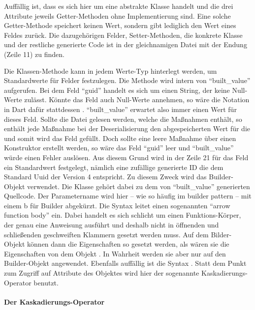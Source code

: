 Auffällig ist, dass es sich hier um eine abstrakte Klasse handelt und die drei Attribute jeweils Getter-Methoden ohne Implementierung sind.
Eine solche Getter-Methode speichert keinen Wert, sondern gibt lediglich den Wert eines Feldes zurück.
Die dazugehörigen Felder,  Setter-Methoden, die konkrete Klasse und der restliche generierte Code ist in der gleichnamigen Datei mit der Endung  (Zeile 11) zu finden.

Die Klassen-Methode  kann in jedem Werte-Typ hinterlegt werden, um Standardwerte für Felder festzulegen.
Die Methode wird intern von \enquote{built_value} aufgerufen.
Bei dem Feld \enquote{guid} handelt es sich um einen String, der keine Null-Werte zulässt.
Könnte das Feld auch Null-Werte annehmen, so wäre die Notation in Dart dafür stattdessen . \enquote{built_value} erwartet also immer einen Wert für dieses Feld. Sollte die Datei gelesen werden, welche die Maßnahmen enthält, so enthält jede Maßnahme bei der Deserialisierung den abgespeicherten Wert für die  und somit wird das Feld gefüllt. Doch sollte eine leere Maßnahme über einen Konstruktor erstellt werden, so wäre das Feld \enquote{guid} leer und \enquote{built_value} würde einen Fehler auslösen. Aus diesem Grund wird in der Zeile 21 für das Feld  ein Standardwert festgelegt, nämlich eine zufällige generierte ID die dem Standard Uuid der Version 4 entspricht.
Zu diesem Zweck wird das Builder-Objekt verwendet.
Die Klasse  gehört dabei zu dem von \enquote{built_value} generierten Quellcode.
Der Parametername wird hier – wie so häufig im builder pattern – mit einem b für Builder abgekürzt.
Die Syntax \IC{=>} leitet  einen sogenannten \enquote{arrow function body} ein.
Dabei handelt es sich schlicht um einen Funktions-Körper, der genau eine Anweisung ausführt und deshalb nicht in öffnenden und schließenden geschweiften Klammern gesetzt werden muss.
Auf dem Bilder-Objekt können dann die Eigenschaften so gesetzt werden, als wären sie die Eigenschaften von dem Objekt .
In Wahrheit werden sie aber nur auf den Builder-Objekt angewendet.  Ebenfalls auffällig ist die Syntax .  Statt dem Punkt zum Zugriff auf Attribute des Objektes wird hier der sogenannte Kaskadierungs-Operator benutzt.

\paragraph{Der Kaskadierungs-Operator}

